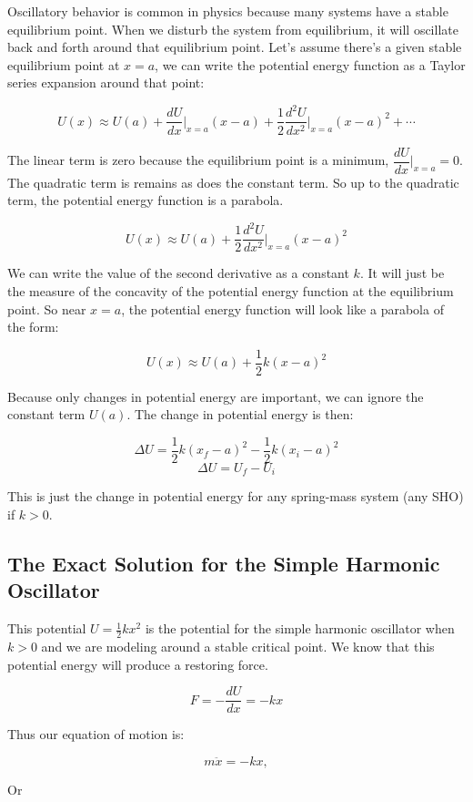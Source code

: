 \documentclass[11pt]{article}
\begin{document}
Oscillatory behavior is common in physics because many systems have a
stable equilibrium point. When we disturb the system from equilibrium,
it will oscillate back and forth around that equilibrium point. Let's
assume there's a given stable equilibrium point at \(x=a\), we can write
the potential energy function as a Taylor series expansion around that
point:

\[U(x) \approx U(a) + \dfrac{dU}{dx}\bigg|_{x=a}(x-a) + \dfrac{1}{2}\dfrac{d^2U}{dx^2}\bigg|_{x=a}(x-a)^2 + \cdots\]

The linear term is zero because the equilibrium point is a minimum,
\(\dfrac{dU}{dx}\bigg|_{x=a}=0\). The quadratic term is remains as does
the constant term. So up to the quadratic term, the potential energy
function is a parabola.

\[U(x) \approx U(a) + \dfrac{1}{2}\dfrac{d^2U}{dx^2}\bigg|_{x=a}(x-a)^2\]

We can write the value of the second derivative as a constant \(k\). It
will just be the measure of the concavity of the potential energy
function at the equilibrium point. So near \(x=a\), the potential energy
function will look like a parabola of the form:

\[U(x) \approx U(a) + \dfrac{1}{2}k(x-a)^2\]

Because only changes in potential energy are important, we can ignore
the constant term \(U(a)\). The change in potential energy is then:

\[\Delta U = \dfrac{1}{2}k(x_f-a)^2 - \dfrac{1}{2}k(x_i-a)^2\]
\[\Delta U = U_f - U_i\]

This is just the change in potential energy for any spring-mass system
(any SHO) if \(k>0\).

    \subsection{The Exact Solution for the Simple Harmonic
Oscillator}\label{the-exact-solution-for-the-simple-harmonic-oscillator}

This potential \(U=\frac{1}{2}kx^2\) is the potential for the simple
harmonic oscillator when \(k>0\) and we are modeling around a stable
critical point. We know that this potential energy will produce a
restoring force.

\[F = -\dfrac{dU}{dx} = -kx\]

Thus our equation of motion is:

\[m\ddot{x} = -kx,\]

Or
\end{document}
